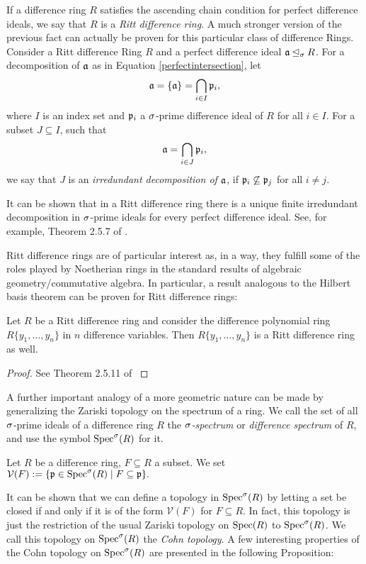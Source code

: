 If a difference ring $R$ satisfies the ascending chain condition for perfect difference ideals, we say that $R$ is a \emph{Ritt difference ring}.
A much stronger version of the previous fact can actually be proven for this  particular class of difference Rings.  Consider a Ritt difference Ring $R$ and a perfect difference ideal $\mathfrak{a} \unlhd_{\sigma} R$. 
For a decomposition of $\mathfrak{a}$ as in Equation \ref{perfectintersection}, let $$\mathfrak{a} = \{ \mathfrak{a} \} = \bigcap_{i \in I} \mathfrak{p}_i,$$ where $I$ is an index set and $\mathfrak{p}_i$ a $\sigma$-prime difference ideal of $R$ for all $i \in I$.
For a subset $J \subseteq I$, such that $$ \mathfrak{a} = \bigcap_{i \in J} \mathfrak{p}_i,$$ we say that $J$ is an \emph{irredundant decomposition of $\mathfrak{a}$},
if $\mathfrak{p}_i \not \subseteq \mathfrak{p}_j$ for all $i \neq j.$

It can be shown that in a Ritt difference ring there is a unique finite irredundant decomposition in $\sigma$-prime ideals for every perfect difference ideal. See, for example, Theorem 2.5.7 of \cite{levin}. 

Ritt difference rings are of particular interest as, in a way, they fulfill some of the roles played by Noetherian rings in the standard results of algebraic geometry/commutative algebra.
In particular, a result analogous to the Hilbert basis theorem can be proven for Ritt difference rings:

\begin{theorem}
Let $R$ be a Ritt difference ring and consider the difference polynomial ring $R\{y_1, \ldots, y_n\}$ in $n$ difference variables. Then $R\{y_1, \ldots, y_n\}$ is a Ritt difference ring as well.
\begin{proof} See Theorem 2.5.11 of \cite{levin} \end{proof}
\end{theorem}

A further important analogy of a more geometric nature can be made by generalizing the Zariski topology on the spectrum of a ring. 
We call the set of all $\sigma$-prime ideals of a difference ring $R$ the \emph{$\sigma$-spectrum} or \emph{difference spectrum}  of $R$, and use the symbol $\operatorname{Spec}^\sigma(R)$ for it.

\begin{defn}
Let $R$ be a difference ring, $F \subseteq R$ a subset. We set $\mathcal{V}(F) := \{ \mathfrak{p} \in \operatorname{Spec}^\sigma(R) \mid F \subseteq \mathfrak{p} \}.$
\end{defn}

It can be shown that we can define a topology in $\operatorname{Spec}^\sigma(R)$ by letting a set be closed if and only if it is of the form $\mathcal{V}(F)$ for $F \subseteq R$. 
In fact, this topology is just the restriction of the usual Zariski topology on $\operatorname{Spec}(R)$ to $\operatorname{Spec}^\sigma(R)$.
We call this topology on $\operatorname{Spec}^\sigma(R)$ the \emph{Cohn topology}. A few interesting properties of the Cohn topology on $\operatorname{Spec}^\sigma(R)$ are presented in the following Proposition:

